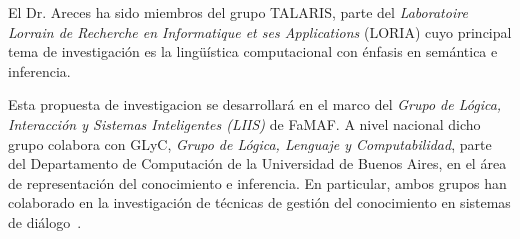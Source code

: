 \documentclass[10.9pt,a4paper]{article}
\begin{document}
El Dr. Areces ha sido miembros del grupo 
TALARIS, parte del \emph{Laboratoire Lorrain de Recherche en 
Informatique et ses Applications} (LORIA) cuyo principal tema de 
investigaci\'on es la ling\"u\'istica computacional con \'enfasis en 
sem\'antica e inferencia.

Esta propuesta de investigacion se desarrollar\'a en el marco del \emph{
Grupo de L\'ogica, Interacci\'on y Sistemas Inteligentes (LIIS)} de FaMAF.
A nivel nacional dicho grupo colabora con GLyC, \emph{Grupo de L\'ogica, 
Lenguaje y Computabilidad}, parte del Departamento de Computaci\'on de 
la Universidad de Buenos Aires, en el \'area de representaci\'on del 
conocimiento e inferencia. En particular, ambos grupos han colaborado en 
la investigaci\'on de t\'ecnicas de gesti\'on del conocimiento en sistemas de 
di\'alogo~\citep{arec:usin11}. 

\begin{spacing}{0.77}


\end{spacing}
\end{document}

